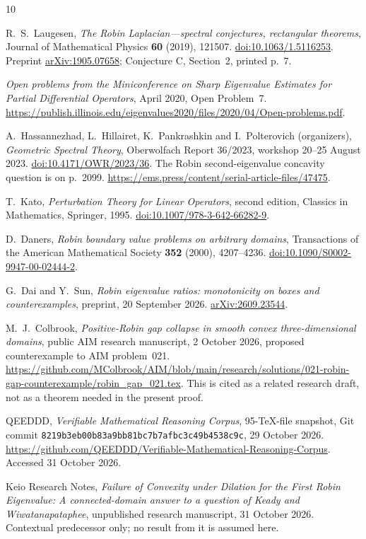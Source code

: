 \documentclass[11pt,a4paper]{article}
\theoremstyle{definition}\newtheorem{definition}[theorem]{Definition}
\theoremstyle{remark}\newtheorem{remark}[theorem]{Remark}
\begin{document}
\begin{thebibliography}{10}
\small\raggedright

R.~S.~Laugesen,
\emph{The Robin Laplacian---spectral conjectures, rectangular theorems},
Journal of Mathematical Physics \textbf{60} (2019), 121507.
\href{https://doi.org/10.1063/1.5116253}{doi:10.1063/1.5116253}.
Preprint \href{https://arxiv.org/abs/1905.07658}{arXiv:1905.07658};
Conjecture C, Section~2, printed p.~7.

\emph{Open problems from the Miniconference on Sharp Eigenvalue
Estimates for Partial Differential Operators}, April 2020,
Open Problem~7.
\url{https://publish.illinois.edu/eigenvalues2020/files/2020/04/Open-problems.pdf}.

A.~Hassannezhad, L.~Hillairet, K.~Pankrashkin and I.~Polterovich
(organizers),
\emph{Geometric Spectral Theory},
Oberwolfach Report 36/2023, workshop 20--25 August 2023.
\href{https://doi.org/10.4171/OWR/2023/36}{doi:10.4171/OWR/2023/36}.
The Robin second-eigenvalue concavity question is on p.~2099.
\url{https://ems.press/content/serial-article-files/47475}.

T.~Kato, \emph{Perturbation Theory for Linear Operators},
second edition, Classics in Mathematics, Springer, 1995.
\href{https://doi.org/10.1007/978-3-642-66282-9}{doi:10.1007/978-3-642-66282-9}.

D.~Daners, \emph{Robin boundary value problems on arbitrary domains},
Transactions of the American Mathematical Society
\textbf{352} (2000), 4207--4236.
\href{https://doi.org/10.1090/S0002-9947-00-02444-2}{doi:10.1090/S0002-9947-00-02444-2}.

G.~Dai and Y.~Sun,
\emph{Robin eigenvalue ratios: monotonicity on boxes and counterexamples},
preprint, 20 September 2026.
\href{https://arxiv.org/abs/2609.23544}{arXiv:2609.23544}.

M.~J.~Colbrook,
\emph{Positive-Robin gap collapse in smooth convex three-dimensional domains},
public AIM research manuscript, 2 October 2026,
proposed counterexample to AIM problem~021.
\url{https://github.com/MColbrook/AIM/blob/main/research/solutions/021-robin-gap-counterexample/robin_gap_021.tex}.
This is cited as a related research draft, not as a theorem
needed in the present proof.

QEEDDD, \emph{Verifiable Mathematical Reasoning Corpus},
95-TeX-file snapshot, Git commit
\texttt{8219b3eb00b83a9bb81bc7b7afbc3c49b4538c9c},
29 October 2026.
\url{https://github.com/QEEDDD/Verifiable-Mathematical-Reasoning-Corpus}.
Accessed 31 October 2026.

Keio Research Notes,
\emph{Failure of Convexity under Dilation for the First Robin Eigenvalue:
A connected-domain answer to a question of Keady and Wiwatanapataphee},
unpublished research manuscript, 31 October 2026.
Contextual predecessor only; no result from it is assumed here.

\end{thebibliography}
\end{document}
